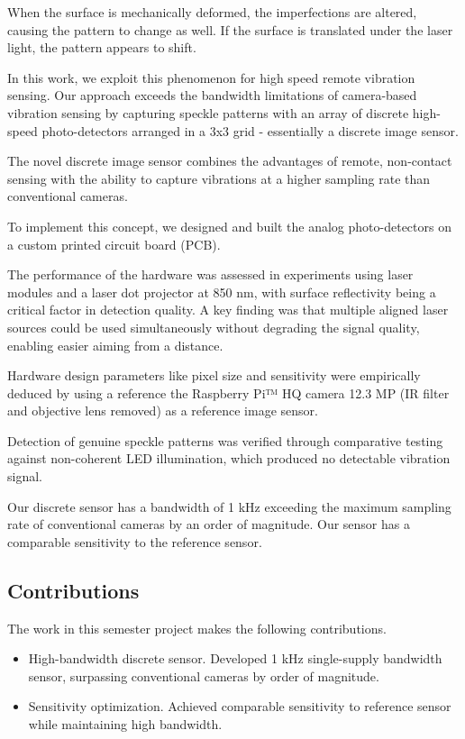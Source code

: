 When the surface is mechanically deformed, the imperfections are altered, causing the pattern to change as well. If the surface is translated under the laser light, the pattern appears to shift.

In this work, we exploit this phenomenon for high speed remote vibration sensing. Our approach exceeds the bandwidth limitations of camera-based vibration sensing by capturing speckle patterns with an array of discrete high-speed photo-detectors arranged in a 3x3 grid - essentially a discrete image sensor.

The novel discrete image sensor combines the advantages of remote, non-contact sensing with the ability to capture vibrations at a higher sampling rate than conventional cameras.

To implement this concept, we designed and built the analog photo-detectors on a custom printed circuit board (PCB).

The performance of the hardware was assessed in experiments using laser modules and a laser dot projector at 850 \si{\nano\meter}, with surface reflectivity being a critical factor in detection quality. A key finding was that multiple aligned laser sources could be used simultaneously without degrading the signal quality, enabling easier aiming from a distance.

Hardware design parameters like pixel size and sensitivity were empirically deduced by using a reference the Raspberry Pi™ HQ camera 12.3 MP (IR filter and objective lens removed) as a reference image sensor.

Detection of genuine speckle patterns was verified through comparative testing against non-coherent LED illumination, which produced no detectable vibration signal.

Our discrete sensor has a bandwidth of 1 \si{\kilo\hertz} exceeding the maximum sampling rate of conventional cameras by an order of magnitude. Our sensor has a comparable sensitivity to the reference sensor. 

\subsection{Contributions}

The work in this semester project makes the following contributions.

\begin{itemize}
    \item High-bandwidth discrete sensor. Developed 1 kHz single-supply bandwidth sensor, surpassing conventional cameras by order of magnitude.
    \item Sensitivity optimization. Achieved comparable sensitivity to reference sensor while maintaining high bandwidth.
\end{itemize}